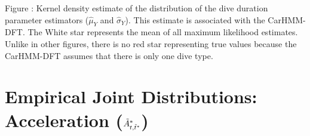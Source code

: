 \documentclass{article}
\begin{document}
        \noindent Figure : Kernel density estimate of the distribution of the dive duration parameter estimators ($\hat \mu_Y$ and $\hat \sigma_Y$). This estimate is associated with the CarHMM-DFT. The White star represents the mean of all maximum likelihood estimates. Unlike in other figures, there is no red star representing true values because the CarHMM-DFT assumes that there is only one dive type.
        \addtocounter{fignum}{1}
    
    \newpage
    \section{Empirical Joint Distributions: Acceleration ($\tilde{A}^*_{t,\tilde t^*}$)}

        \begin{center}
\end{center}
\end{document}
